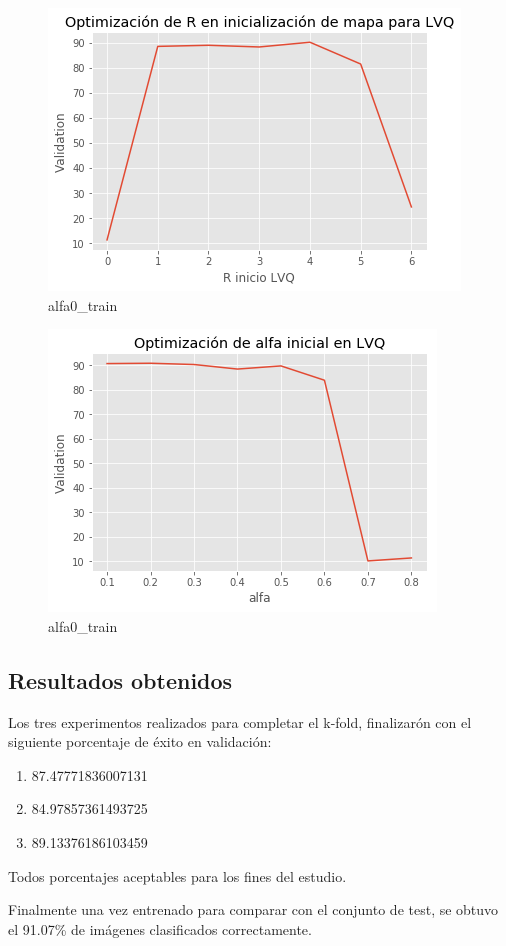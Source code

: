 \documentclass[
]{article}
\providecommand{\tightlist}{%
  \setlength{\itemsep}{0pt}\setlength{\parskip}{0pt}}
\begin{document}
\begin{figure}
\centering
\includegraphics{kohonen_tests/r_init_LVQ.png}
\caption{alfa0\_train}
\end{figure}

\begin{figure}
\centering
\includegraphics{kohonen_tests/alfa0_lvq.png}
\caption{alfa0\_train}
\end{figure}

\hypertarget{resultados-obtenidos}{%
\subsection{Resultados obtenidos}\label{resultados-obtenidos}}

Los tres experimentos realizados para completar el k-fold, finalizarón
con el siguiente porcentaje de éxito en validación:

\begin{enumerate}
\def\labelenumi{\arabic{enumi})}
\tightlist
\item
  87.47771836007131
\item
  84.97857361493725
\item
  89.13376186103459
\end{enumerate}

Todos porcentajes aceptables para los fines del estudio.

Finalmente una vez entrenado para comparar con el conjunto de test, se
obtuvo el 91.07\% de imágenes clasificados correctamente.
\end{document}
